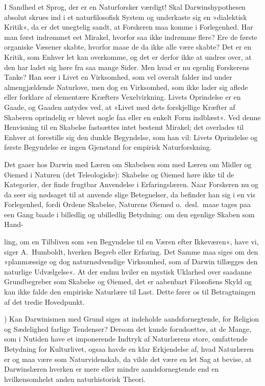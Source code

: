 \documentclass[12pt,a4paper]{article}
\begin{document}
I Sandhed et Sprog, der er en Naturforsker værdigt! Skal
Darwinshypothesen absolut skrues ind i et naturfilosofisk System og
underkaste sig en »dialektisk Kritik«, da er det unegtelig sandt, at
Forskeren maa komme i Forlegenhed. Har man først indrømmet eet Mirakel,
hvorfor saa ikke indrømme flere? Ere de første organiske Væsener
skabte, hvorfor maae de da ikke alle være skabte? Det er en Kritik,
som Enhver let kan overkomme, og det er derfor ikke at undres over, at
den har ladet sig høre fra saa mange Sider. Men hvad er nu egenlig
Forskerens Tanke? Han seer i Livet en Virksomhed, som vel overalt
falder ind under almengjældende Naturlove, men dog en Virksomhed, som
ikke lader sig aflede eller forklare af elementære Kræfters
Vexelvirkning. Livets Oprindelse er en Gaade, og Gaaden antydes ved,
at »Livet med dets forskjellige Kræfter af Skaberen oprindelig er
blevet nogle faa eller en enkelt Form indblæst«. Ved denne Henvisning
til en Skabelse fastsættes intet bestemt Mirakel; det overlades til
Enhver at forestille sig den dunkle Begyndelse, som han vil: Livets
Oprindelse og første Begyndelse er ingen Gjenstand for empirisk
Naturforskning.

Det gaaer hos Darwin med Læren om Skabelsen som med Læren om Midler og
Øiemed i Naturen (det Teleologiske): Skabelse og Øiemed høre ikke til
de Kategorier, der finde frugtbar Anvendelse i Erfaringslæren. Naar
Forskeren nu og da seer sig nødsaget til at anvende slige Betegnelser,
da befinder han sig i en vis Forlegenhed, fordi Ordene Skabelse,
Naturens Øiemed o.\ desl.\ maae tages paa een Gang baade i billedlig
og ubilledlig Betydning: om den egenlige Skaben som Hand-


ling, om en Tilbliven som »en Begyndelse til en Væren efter Ikkeværen«,
have vi, siger A.\ Humboldt, hverken Begreb eller Erfaring. Det Samme
maa siges om den »planmæssige og dog naturnødvendige Virksomhed, som
af Darwin tillægges den naturlige Udvælgelse«. At der endnu hviler en
mystisk Uklarhed over saadanne Grundbegreber som Skabelse og Øiemed,
det er aabenbart Filosofiens Skyld og kan ikke falde den empiriske
Naturlære til Last. Dette fører os til Betragtningen af det tredie
Hovedpunkt.


\medskip

) Kan Darwinismen med Grund siges at indeholde
aandsfornegtende, for Religion og Sædelighed farlige Tendenser?
Dersom det kunde forudsættes, at de Mange, som i Nutiden have et
imponerende Indtryk af Naturlærens store, omfattende Betydning for
Kulturlivet, ogsaa havde en klar Erkjendelse af, hvad Naturlæren er og
maa være som Naturvidenskab, da vilde det være en let Sag at bevise,
at Darwinslæren hverken er mere eller mindre aandsfornegtende end en
hvilkensomhelst anden naturhistorisk Theori.
\end{document}
